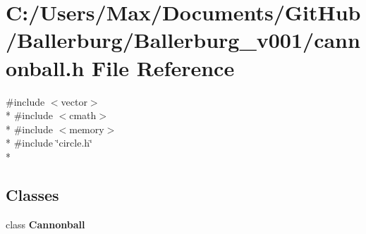 \section{C\+:/\+Users/\+Max/\+Documents/\+Git\+Hub/\+Ballerburg/\+Ballerburg\+\_\+v001/cannonball.h File Reference}
\label{cannonball_8h}
{\ttfamily \#include $<$vector$>$}\\*
{\ttfamily \#include $<$cmath$>$}\\*
{\ttfamily \#include $<$memory$>$}\\*
{\ttfamily \#include \char`\"{}circle.\+h\char`\"{}}\\*
\subsection*{Classes}
\begin{DoxyCompactItemize}
\item 
class {\bf Cannonball}
\end{DoxyCompactItemize}
